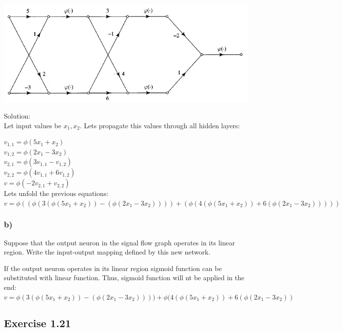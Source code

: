 \documentclass[a4paper, 12pt]{article}
\begin{document}
\includegraphics[scale=0.7]{113.png}

Solution:\\

Let input values be $x_1,x_2$. Lets propagate this values through all hidden layers:

$v_{1,1} = \phi(5x_1+x_2)$ \\

$v_{1,2} = \phi(2x_1-3x_2)$ \\

$v_{2,1} = \phi(3v_{1,1}-v_{1,2})$ \\

$v_{2,2} = \phi(4v_{1,1}+6v_{1,2})$ \\

$v = \phi(-2v_{2,1}+v_{2,2})$ \\

Lets unfold the previous equations:
\\

$v = \phi((\phi(3(\phi(5x_1+x_2))-(\phi(2x_1-3x_2))))+(\phi(4(\phi(5x_1+x_2))+6(\phi(2x_1-3x_2)))))$

\subsubsection{b)}
Suppose that the output neuron in the signal flow graph operates in its linear region. Write the input-output mapping defined by this new network.

If the output neuron operates in its linear region sigmoid function can be substituted with linear function. Thus, sigmoid function will nt be applied in the end:
\\

$v = \phi(3(\phi(5x_1+x_2))-(\phi(2x_1-3x_2))))+\phi(4(\phi(5x_1+x_2))+6(\phi(2x_1-3x_2))$


\subsection{Exercise 1.21}
\end{document}
